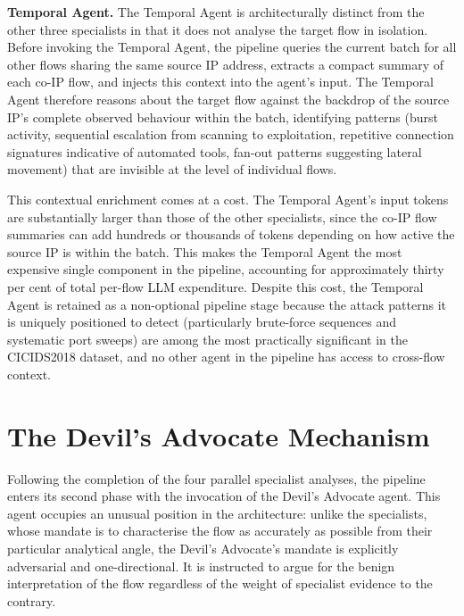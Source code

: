 \documentclass[../main.tex]{subfiles}
\begin{document}
\textbf{Temporal Agent.} The Temporal Agent is architecturally distinct from the other three specialists in that it does not analyse the target flow in isolation. Before invoking the Temporal Agent, the pipeline queries the current batch for all other flows sharing the same source IP address, extracts a compact summary of each co-IP flow, and injects this context into the agent's input. The Temporal Agent therefore reasons about the target flow against the backdrop of the source IP's complete observed behaviour within the batch, identifying patterns (burst activity, sequential escalation from scanning to exploitation, repetitive connection signatures indicative of automated tools, fan-out patterns suggesting lateral movement) that are invisible at the level of individual flows.

This contextual enrichment comes at a cost. The Temporal Agent's input tokens are substantially larger than those of the other specialists, since the co-IP flow summaries can add hundreds or thousands of tokens depending on how active the source IP is within the batch. This makes the Temporal Agent the most expensive single component in the pipeline, accounting for approximately thirty per cent of total per-flow LLM expenditure. Despite this cost, the Temporal Agent is retained as a non-optional pipeline stage because the attack patterns it is uniquely positioned to detect (particularly brute-force sequences and systematic port sweeps) are among the most practically significant in the CICIDS2018 dataset, and no other agent in the pipeline has access to cross-flow context.

\section{The Devil's Advocate Mechanism}
\label{sec:devils-advocate}

Following the completion of the four parallel specialist analyses, the pipeline enters its second phase with the invocation of the Devil's Advocate agent. This agent occupies an unusual position in the architecture: unlike the specialists, whose mandate is to characterise the flow as accurately as possible from their particular analytical angle, the Devil's Advocate's mandate is explicitly adversarial and one-directional. It is instructed to argue for the benign interpretation of the flow regardless of the weight of specialist evidence to the contrary.
\end{document}
